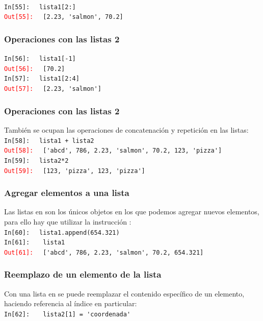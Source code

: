 \documentclass[12pt]{beamer}
\begin{document}
{\begin{frame}[fragile]
\\
\bigskip
\textcolor{ao}{\texttt{In[55]: }} \verb| lista1[2:]|
\\
\pause
\textcolor{red}{\texttt{Out[55]: }} \verb| [2.23, 'salmon', 70.2]|
\end{frame}
\begin{frame}[fragile]
\frametitle{Operaciones con las listas 2}
\textcolor{ao}{\texttt{In[56]: }} \verb| lista1[-1]|
\\
\pause
\textcolor{red}{\texttt{Out[56]: }} \verb| [70.2]|
\\
\bigskip
\pause
\textcolor{ao}{\texttt{In[57]: }} \verb| lista1[2:4]|
\\
\pause
\textcolor{red}{\texttt{Out[57]: }} \verb| [2.23, 'salmon']|
\end{frame}
\begin{frame}[fragile]
\frametitle{Operaciones con las listas 2}
También se ocupan las operaciones de concatenación y repetición en las listas:
\\
\bigskip
\textcolor{ao}{\texttt{In[58]: }} \verb| lista1 + lista2|
\\
\pause
\begingroup
\fontsize{13}{13}\selectfont
\textcolor{red}{\texttt{Out[58]: }} \verb| ['abcd', 786, 2.23, 'salmon', 70.2, 123, 'pizza']|
\endgroup
\\
\bigskip
\pause
\textcolor{ao}{\texttt{In[59]: }} \verb| lista2*2|
\\
\pause
\textcolor{red}{\texttt{Out[59]: }} \verb| [123, 'pizza', 123, 'pizza']|
\end{frame}
\begin{frame}[fragile]
\frametitle{Agregar elementos a una lista}
Las listas en \python{} son los únicos objetos en los que podemos agregar nuevos elementos, para ello hay que utilizar la instrucción :
\\
\bigskip
\textcolor{ao}{\texttt{In[60]: }} \verb| lista1.append(654.321)|
\\
\pause
\textcolor{ao}{\texttt{In[61]: }} \verb|  lista1|
\\
\pause
\textcolor{red}{\texttt{Out[61]: }} \verb| ['abcd', 786, 2.23, 'salmon', 70.2, 654.321]|
\end{frame}
\begin{frame}[fragile]
\frametitle{Reemplazo de un elemento de la lista}
Con una lista en \python{} se puede reemplazar el contenido específico de un elemento, haciendo referencia al índice en particular:
\\
\bigskip
\textcolor{ao}{\texttt{In[62]: }} \verb|  lista2[1] = 'coordenada'|

\end{frame}}
\end{document}
